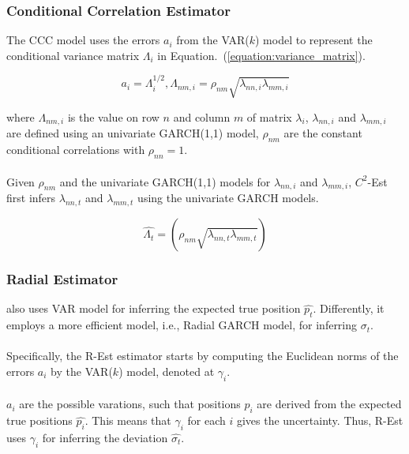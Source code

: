 \begin{frame}
\frametitle{Conditional Correlation Estimator}

The CCC model uses the errors $a_i$ from the VAR($k$) model to represent the conditional variance matrix $\Lambda_i$ in Equation.~(\ref{equation:variance_matrix}).

\begin{equation}
  a_i = \Lambda_i^{1/2}, \Lambda_{nm,i} = \rho_{nm} \sqrt{\lambda_{nn,i}\lambda_{mm,i}}
\end{equation}

where $\Lambda_{nm,i}$ is the value on row $n$ and column $m$ of matrix $\lambda_{i}$, $\lambda_{nn,i}$ and $\lambda_{mm,i}$ are defined using an univariate GARCH(1,1) model, $\rho_{nm}$ are the constant conditional correlations with $\rho_{nn} =1$.\\~\\

Given $\rho_{nm}$ and the univariate GARCH(1,1) models for $\lambda_{nn,i}$ and $\lambda_{mm,i}$, $C^2$-Est first infers $\lambda_{nn,t}$ and $\lambda_{mm,t}$ using the univariate GARCH models.

\begin{equation}
  \hat{\Lambda_t} = (\rho_{nm} \sqrt{\lambda_{nn,t} \lambda_{mm,t}})
\end{equation}

\end{frame}


\begin{frame}
\frametitle{Radial Estimator}

 also uses VAR model for inferring the expected true position $\hat{p_t}$. Differently, it employs a more efficient model, i.e., Radial GARCH model, for inferring $\sigma_t$.\\~\\

Specifically, the R-Est estimator starts by computing the Euclidean norms of the errors $a_i$ by the VAR($k$) model, denoted at $\gamma_i$.\\~\\

$a_i$ are the possible varations, such that positions $p_i$ are derived from the expected true positions $\hat{p_i}$. This means that $\gamma_i$ for each $i$ gives the uncertainty. Thus, R-Est uses $\gamma_i$ for inferring the deviation $\hat{\sigma_t}$.

\end{frame}


